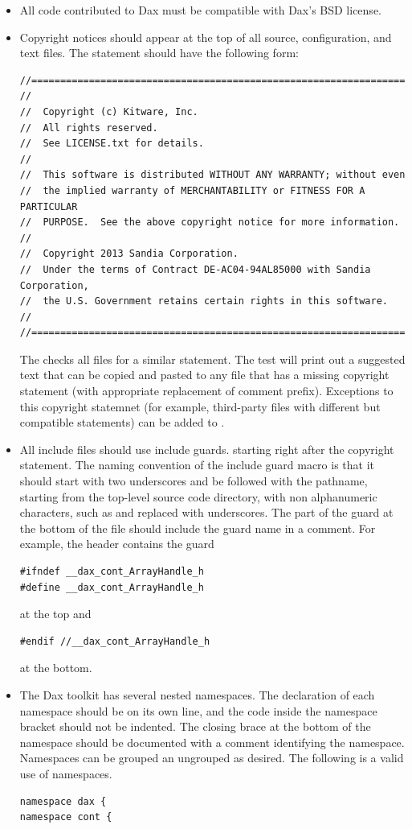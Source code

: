\begin{itemize}
\item All code contributed to Dax must be compatible with Dax's BSD
  license.
\item Copyright notices should appear at the top of all source,
  configuration, and text files. The statement should have the following
  form:
\small\begin{verbatim}
//==========================================================================
//
//  Copyright (c) Kitware, Inc.
//  All rights reserved.
//  See LICENSE.txt for details.
//
//  This software is distributed WITHOUT ANY WARRANTY; without even
//  the implied warranty of MERCHANTABILITY or FITNESS FOR A PARTICULAR
//  PURPOSE.  See the above copyright notice for more information.
//
//  Copyright 2013 Sandia Corporation.
//  Under the terms of Contract DE-AC04-94AL85000 with Sandia Corporation,
//  the U.S. Government retains certain rights in this software.
//
//==========================================================================
\end{verbatim}
  The  checks all files for a similar
  statement. The test will print out a suggested text that can be copied
  and pasted to any file that has a missing copyright statement (with
  appropriate replacement of comment prefix). Exceptions to this copyright
  statemnet (for example, third-party files with different but compatible
  statements) can be added to .
\item All include files should use include guards. starting right after the
  copyright statement. The naming convention of the include guard macro is
  that it should start with two underscores and be followed with the
  pathname, starting from the top-level source code directory, with non
  alphanumeric characters, such as \textcode{/} and  replaced
  with underscores. The  part of the guard at the bottom
  of the file should include the guard name in a comment. For example, the
   header contains the guard
  \begin{verbatim}
#ifndef __dax_cont_ArrayHandle_h
#define __dax_cont_ArrayHandle_h
\end{verbatim}
  at the top and
  \begin{verbatim}
#endif //__dax_cont_ArrayHandle_h
\end{verbatim}
  at the bottom.
\item The Dax toolkit has several nested namespaces. The declaration of
  each namespace should be on its own line, and the code inside the
  namespace bracket should not be indented. The closing brace at the bottom
  of the namespace should be documented with a comment identifying the
  namespace. Namespaces can be grouped an ungrouped as desired. The
  following is a valid use of namespaces.
  \begin{verbatim}
namespace dax {
namespace cont {


\end{verbatim}
\end{itemize}
